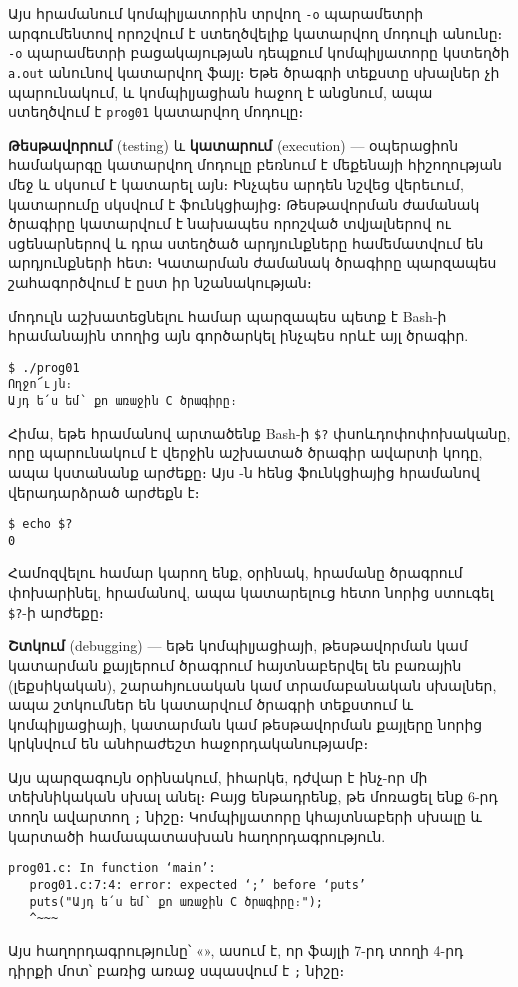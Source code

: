 Այս հրամանում կոմպիլյատորին տրվող \verb|-o| պարամետրի արգումենտով
որոշվում է ստեղծվելիք կատարվող մոդուլի անունը։ \verb|-o| պարամետրի
բացակայության դեպքում կոմպիլյատորը կստեղծի \verb|a.out| անունով
կատարվող ֆայլ։ Եթե ծրագրի տեքստը սխալներ չի պարունակում, և կոմպիլյացիան
հաջող է անցնում, ապա ստեղծվում է \verb|prog01| կատարվող մոդուլը։

\textbf{Թեսթավորում} (testing) և \textbf{կատարում} (execution) ---
օպերացիոն համակարգը կատարվող մոդուլը բեռնում է մեքենայի հիշողության
մեջ և սկսում է կատարել այն։ Ինչպես արդեն նշվեց վերեւում, կատարումը
սկսվում է  ֆունկցիայից։ Թեսթավորման ժամանակ ծրագիրը
կատարվում է նախապես որոշված տվյալներով ու սցենարներով և դրա ստեղծած
արդյունքները համեմատվում են արդյունքների հետ։ Կատարման ժամանակ ծրագիրը
պարզապես շահագործվում է ըստ իր նշանակության։

 մոդուլն աշխատեցնելու համար պարզապես պետք է Bash-ի
հրամանային տողից այն գործարկել ինչպես որևէ այլ ծրագիր.

\begin{Verbatim}
$ ./prog01
Ողջո՜ւյն։
Այդ ե՛ս եմ՝ քո առաջին C ծրագիրը։
\end{Verbatim}

Հիմա, եթե  հրամանով արտածենք Bash-ի \verb|$?|
փսոևդոփոփոխականը, որը պարունակում է վերջին աշխատած ծրագիր ավարտի
կոդը, ապա կստանանք  արժեքը։ Այս -ն հենց 
ֆունկցիայից  հրամանով վերադարձրած արժեքն է։

\begin{Verbatim}
$ echo $?
0
\end{Verbatim}

Համոզվելու համար կարող ենք, օրինակ,  հրամանը
ծրագրում փոխարինել,  հրամանով, ապա կատարելուց
հետո նորից ստուգել \verb|$?|-ի արժեքը։

\textbf{Շտկում} (debugging) --- եթե կոմպիլյացիայի, թեսթավորման
կամ կատարման քայլերում ծրագրում հայտնաբերվել են բառային (լեքսիկական),
շարահյուսական կամ տրամաբանական սխալներ,  ապա շտկումներ են կատարվում
ծրագրի տեքստում և կոմպիլյացիայի, կատարման կամ թեսթավորման քայլերը
նորից կրկնվում են անհրաժեշտ հաջորդականությամբ։

Այս պարզագույն օրինակում, իհարկե, դժվար է ինչ-որ մի տեխնիկական
սխալ անել։ Բայց ենթադրենք, թե մոռացել ենք 6-րդ տողն ավարտող
\verb|;| նիշը։ Կոմպիլյատորը կհայտնաբերի սխալը և կարտածի
համապատասխան հաղորդագրություն.

\begin{Verbatim}
prog01.c: In function ‘main’:
   prog01.c:7:4: error: expected ‘;’ before ‘puts’
   puts("Այդ ե՛ս եմ՝ քո առաջին C ծրագիրը։");
   ^~~~
\end{Verbatim}

Այս հաղորդագրությունը՝ «», ասում է, որ  ֆայլի 7-րդ տողի 4-րդ
դիրքի մոտ՝  բառից առաջ սպասվում է \verb|;| նիշը։
